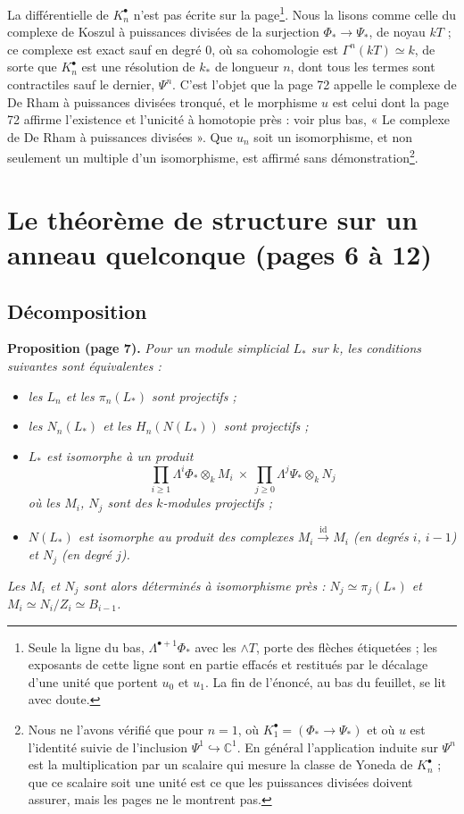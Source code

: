 \documentclass[11pt,a4paper]{article}
\begin{document}
La différentielle de $K_{n}^{\bullet}$ n'est pas écrite sur la
page\footnote{Seule la ligne du bas, $\Lambda^{\bullet+1}\Phi_{*}$ avec les
$\wedge T$, porte des flèches étiquetées ; les exposants de cette ligne sont
en partie effacés et restitués par le décalage d'une unité que portent
$u_{0}$ et $u_{1}$. La fin de l'énoncé, au bas du feuillet, se lit avec
doute.}. Nous la lisons comme celle du complexe de Koszul à puissances
divisées de la surjection $\Phi_{*} \to \Psi_{*}$, de noyau $kT$ ; ce
complexe est exact sauf en degré $0$, où sa cohomologie est
$\Gamma^{n}(kT) \simeq k$, de sorte que $K_{n}^{\bullet}$ est une résolution
de $k_{*}$ de longueur $n$, dont tous les termes sont contractiles sauf le
dernier, $\Psi^{n}$. C'est l'objet que la page 72 appelle le
complexe de De Rham à puissances divisées tronqué, et le morphisme $u$ est
celui dont la page 72 affirme l'existence et l'unicité à homotopie près :
voir plus bas, « Le complexe de De Rham à puissances divisées ». Que $u_{n}$
soit un isomorphisme, et non seulement un multiple d'un isomorphisme, est
affirmé sans démonstration\footnote{Nous ne l'avons vérifié que pour
$n = 1$, où $K_{1}^{\bullet} = (\Phi_{*} \to \Psi_{*})$ et où $u$ est
l'identité suivie de l'inclusion $\Psi^{1} \hookrightarrow \mathbb{C}^{1}$.
En général l'application induite sur $\Psi^{n}$ est la multiplication par un
scalaire qui mesure la classe de Yoneda de $K_{n}^{\bullet}$ ; que ce
scalaire soit une unité est ce que les puissances divisées doivent assurer,
mais les pages ne le montrent pas.}.

\section*{Le théorème de structure sur un anneau quelconque (pages 6 à 12)}

\subsection*{Décomposition}

\textbf{Proposition (page 7).} \emph{Pour un module simplicial $L_{*}$ sur
$k$, les conditions suivantes sont équivalentes :}
\begin{itemize}
\item[a)] \emph{les $L_{n}$ et les $\pi_{n}(L_{*})$ sont projectifs ;}
\item[a')] \emph{les $N_{n}(L_{*})$ et les $H_{n}(N(L_{*}))$ sont
projectifs ;}
\item[b)] \emph{$L_{*}$ est isomorphe à un produit
\[
  \prod_{i \geqslant 1} \Lambda^{i}\Phi_{*} \otimes_{k} M_{i} \ \times\
  \prod_{j \geqslant 0} \Lambda^{j}\Psi_{*} \otimes_{k} N_{j}
\]
où les $M_{i}$, $N_{j}$ sont des $k$-modules projectifs ;}
\item[b')] \emph{$N(L_{*})$ est isomorphe au produit des complexes
$M_{i} \xrightarrow{\mathrm{id}} M_{i}$ (en degrés $i$, $i-1$) et $N_{j}$
(en degré $j$).}
\end{itemize}
\emph{Les $M_{i}$ et $N_{j}$ sont alors déterminés à isomorphisme près :
$N_{j} \simeq \pi_{j}(L_{*})$ et $M_{i} \simeq N_{i}/Z_{i} \simeq B_{i-1}$.}
\end{document}
